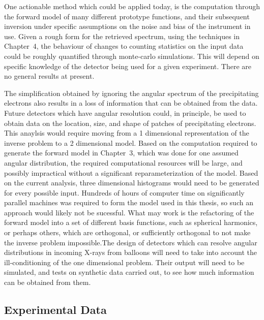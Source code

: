 One actionable method which could be applied today, is the computation  through the forward model of many different prototype functions, and their subsequent inversion under specific assumptions on the noise and bias of the instrument in use. Given a rough form for the retrieved spectrum, using the techniques in Chapter~4, the behaviour of changes to counting statistics on the input data could be roughly quantified through monte-carlo simulations. This will depend on specific knowledge of the detector being used for a given experiment. There are no general results at present. 

The simplification obtained by ignoring the angular spectrum of the precipitating electrons also results in a loss of information that can be obtained from the data. Future detectors which have angular resolution could, in principle, be used to obtain data on the location, size, and  shape of patches of precipitating electrons. This anaylsis would require moving from a 1 dimensional representation of the inverse problem to a 2 dimensional model. Based on the computation required to generate the forward model in Chapter~3, which was done for one assumed angular distribution, the required computational resources will be large, and possibly impractical without a significant reparameterization of the model. Based on the current analysis, three dimensional histograms would need to be generated for every possible input. Hundreds of hours of computer time on significantly parallel machines was required to form the model used in this thesis, so such an approach would likely not be sucessful. What may work is the refactoring of the forward model into a set of different basis functions, such as spherical harmonics, or perhaps others, which are orthogonal, or sufficiently orthogonal to not make the inverse problem impossible.The design of detectors which can resolve angular distributions in incoming X-rays from balloons will need to take into account the ill-conditioning of the one dimensional problem. Their output will need to be simulated, and tests on synthetic data carried out, to see  how much information can be obtained from them. 

\subsection{Experimental Data}

